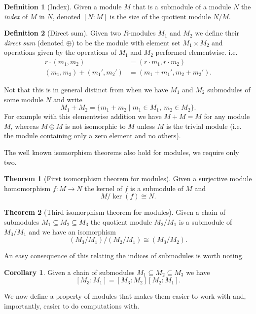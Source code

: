 \documentclass[12pt,a4paper,abstracton,bibtotoc]{scrreprt}
\theoremstyle{definition}
\newtheorem{thm}{Theorem}
\newtheorem{cor}{Corollary}
\newtheorem{defn}{Definition}
\begin{document}
\begin{defn}[Index]
Given a module $M$ that is a submodule of a module $N$ the \emph{index} of $M$ in $N$, denoted $[N:M]$ is the size of the quotient module $N / M$.
\end{defn}

\begin{defn}[Direct sum]
Given two $R$-modules $M_1$ and $M_2$ we define their \emph{direct sum} (denoted $\oplus$) to be the module with element set $M_1 \times M_2$ and operations given by the operations of $M_1$ and $M_2$ performed elementwise. i.e.
\begin{align*}
r\cdot(m_1,m_2) &= (r\cdot m_1, r\cdot m_2)\\
(m_1,m_2) + (m_1',m_2') &= (m_1 + m_1',m_2+m_2').
\end{align*}
\end{defn}

Not that this is in general distinct from when we have $M_1$ and $M_2$ submodules of some module $N$ and write
\[
M_1 + M_2 = \{m_1 + m_2 \mid m_1\in M_1,\ m_2\in M_2\}.
\]
For example with this elementwise addition we have $M + M = M$ for any module $M$, whereas $M\oplus M$ is not isomorphic to $M$ unless $M$ is the trivial module (i.e. the module containing only a zero element and no others).

The well known isomorphism theorems also hold for modules, we require only two.

\begin{thm}[First isomorphism theorem for modules]
Given a surjective module homomorphism $f\colon M \to N$ the kernel of $f$ is a submodule of $M$ and
\[
M/\ker(f) \cong N.
\]
\end{thm}

\begin{thm}[Third isomorphism theorem for modules]
Given a chain of submodules $M_1 \subseteq M_2 \subseteq M_3$ the quotient module $M_2/M_1$ is a submodule of $M_3/M_1$ and we have an isomorphism
\[
(M_3/M_1)/(M_2/M_1) \cong (M_3/M_2).
\]
\end{thm}

An easy consequence of this relating the indices of submodules is worth noting.

\begin{cor}
\label{cor:indexmult}
Given a chain of submodules $M_1 \subseteq M_2 \subseteq M_3$ we have
\[
[M_3:M_1] = [M_3:M_2][M_2:M_1].
\]
\end{cor}

\minisec{}
We now define a property of modules that makes them easier to work with and, importantly, easier to do computations with.
\end{document}
